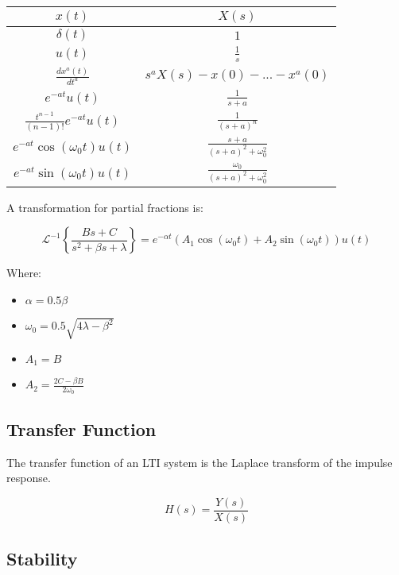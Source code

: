 \documentclass[letterpaper]{article}
\begin{document}
\begin{multicols}{2}
        \begin{center}
        \begin{tabular}{|c|c|}
            \hline
            $x(t)$ & $X(s)$ \\
            \hline
            $\delta(t)$ & $1$ \\
            $u(t)$ & $\frac{1}{s}$ \\
            $\frac{dx^a(t)}{dt^a}$ & $s^a X(s) - x(0) - ... - x^a(0)$ \\
            $e^{-at}u(t)$ & $\frac{1}{s+a}$ \\
            $\frac{t^{n-1}}{(n-1)!} e^{-at}u(t)$ & $\frac{1}{(s+a)^n}$ \\
            $e^{-at} \cos{(\omega_0 t)}u(t)$ & $\frac{s+a}{(s+a)^2 + \omega_0^2}$ \\
            $e^{-at} \sin{(\omega_0 t)}u(t)$ & $\frac{\omega_0}{(s+a)^2 + \omega_0^2}$ \\
            \hline
        \end{tabular}
        \end{center}

        A transformation for partial fractions is:

        \[\mathcal{L}^{-1} \left\{ \frac{Bs + C}{s^2 + \beta s + \lambda} \right\} = e^{-\alpha t} \left( A_1 \cos{(\omega_0 t)} + A_2 \sin{(\omega_0 t)} \right) u(t)\]

        Where:

        \begin{itemize}
            \item $\alpha = 0.5\beta$
            \item $\omega_0 = 0.5 \sqrt{4\lambda - \beta^2}$
            \item $A_1 = B$
            \item $A_2 = \frac{2C - \beta B}{2 \omega_0}$
        \end{itemize}

        \subsection{Transfer Function}

        The transfer function of an LTI system is the Laplace transform of the impulse response.

        \[H(s) = \frac{Y(s)}{X(s)}\]

        \subsection{Stability}


\end{multicols}
\end{document}
